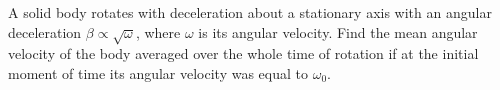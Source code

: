 
\item A solid body rotates with deceleration about a stationary axis with an angular deceleration \(\beta \propto \sqrt{\omega}\), where \(\omega\) is its angular velocity. Find the mean angular velocity of the body averaged over the whole time of rotation if at the initial moment of time its angular velocity was equal to \(\omega_0\).
